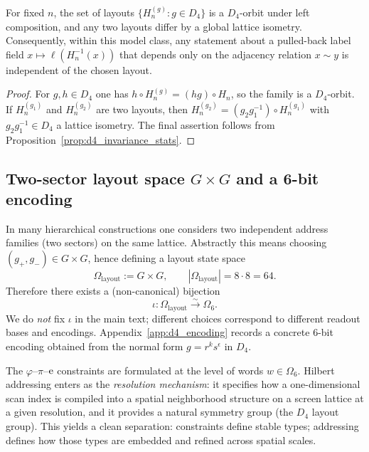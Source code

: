 \begin{corollary}
\label{cor:hilbert_layout_rigidity}
For fixed $n$, the set of layouts $\{H_n^{(g)}:g\in D_4\}$ is a $D_4$-orbit under left composition, and any two layouts differ by a global lattice isometry.
Consequently, within this model class, any statement about a pulled-back label field $x\mapsto \ell(H_n^{-1}(x))$ that depends only on the adjacency relation $x\sim y$ is independent of the chosen layout.
\end{corollary}

\begin{proof}
For $g,h\in D_4$ one has $h\circ H_n^{(g)}=(hg)\circ H_n$, so the family is a $D_4$-orbit.
If $H_n^{(g_1)}$ and $H_n^{(g_2)}$ are two layouts, then $H_n^{(g_2)}=(g_2g_1^{-1})\circ H_n^{(g_1)}$ with $g_2g_1^{-1}\in D_4$ a lattice isometry.
The final assertion follows from Proposition~\ref{prop:d4_invariance_stats}.
\end{proof}

\subsection{Two-sector layout space \texorpdfstring{$G\times G$}{GxG} and a 6-bit encoding}
\label{subsec:two_sector_layout}
In many hierarchical constructions one considers two independent address families (two sectors) on the same lattice.
Abstractly this means choosing $(g_+,g_-)\in G\times G$, hence defining a layout state space
\[
\Omega_{\mathrm{layout}}:=G\times G,
\qquad |\Omega_{\mathrm{layout}}|=8\cdot 8=64.
\]
Therefore there exists a (non-canonical) bijection
\[
\iota:\Omega_{\mathrm{layout}}\xrightarrow{\sim}\Omega_6.
\]
We do \emph{not} fix $\iota$ in the main text; different choices correspond to different readout bases and encodings.
Appendix~\ref{app:d4_encoding} records a concrete $6$-bit encoding obtained from the normal form $g=r^k s^\epsilon$ in $D_4$.

\begin{remark}
The $\varphi$--$\pi$--$\mathrm{e}$ constraints are formulated at the level of words $w\in\Omega_6$.
Hilbert addressing enters as the \emph{resolution mechanism}: it specifies how a one-dimensional scan index is compiled into a spatial neighborhood structure on a screen lattice at a given resolution, and it provides a natural symmetry group (the $D_4$ layout group).
This yields a clean separation: constraints define stable types; addressing defines how those types are embedded and refined across spatial scales.
\end{remark}


